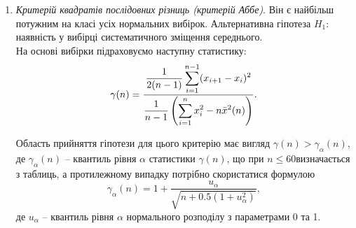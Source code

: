 \begin{enumerate}
	\item \textit{Критерій квадратів послідовних різниць (критерій Аббе)}. Він є найбільш потужним на класі усіх нормальних вибірок. Альтернативна гіпотеза $H_1$: наявність у вибірці систематичного зміщення середнього. \\

	На основі вибірки підраховуємо наступну статистику: \[ \gamma(n) = \dfrac{\dfrac{1}{2(n-1)} \displaystyle\sum\limits_{i=1}^{n-1} (x_{i+1}-x_i)^2}{\dfrac{1}{n-1}\left(\displaystyle\sum\limits_{i=1}^n x_i^2 - n \bar{x}^2(n)\right)}. \]

	Область прийняття гіпотези для цього критерію має вигляд $\gamma(n) > \gamma_\alpha(n)$, де $\gamma_\alpha(n)$ -- квантиль рівня $\alpha$ статистики $\gamma(n)$, що при $n \le 60 $визначається з таблиць, а протилежному випадку потрібно скористатися формулою \[\gamma_\alpha(n) = 1 + \dfrac{u_\alpha}{\sqrt{n + 0.5(1 + u_\alpha^2)}}, \] де $u_\alpha$ -- квантиль рівня $\alpha$ нормального розподілу з параметрами 0 та 1.
\end{enumerate}